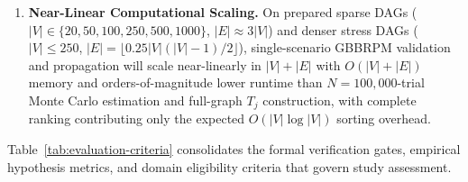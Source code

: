 \begin{enumerate}[label=\textbf{H\arabic*.},leftmargin=*]
Across synthetic DAG families, weights, and source regimes, the zero-cost
scalar bracket width $W_j = R_j - M_j$---computable in a single $O(|V|+|E|)$
pass without oracle knowledge of $\pi_j$---will exhibit strong positive
association with both actual nodewise slack $R_j - \pi_j$ and regime-level
interval-resolved reversal incidence, thereby serving as a computable
reliability indicator for flagging high-distortion cases that warrant Stage~2
or Monte Carlo escalation.
\item \textbf{Near-Linear Computational Scaling.} On prepared sparse DAGs
($|V| \in \{20, 50, 100, 250, 500, 1000\}$, $|E| \approx 3|V|$) and denser
stress DAGs ($|V| \le 250$, $|E| = \lfloor 0.25|V|(|V|-1)/2\rfloor$),
single-scenario GBBRPM validation and propagation will scale near-linearly in
$|V|+|E|$ with $O(|V|+|E|)$ memory and orders-of-magnitude lower runtime than
$N=100{,}000$-trial Monte Carlo estimation and full-graph $T_j$ construction,
with complete ranking contributing only the expected $O(|V|\log|V|)$ sorting
overhead.
\end{enumerate}

Table~\ref{tab:evaluation-criteria} consolidates the formal verification
gates, empirical hypothesis metrics, and domain eligibility criteria that
govern study assessment.

